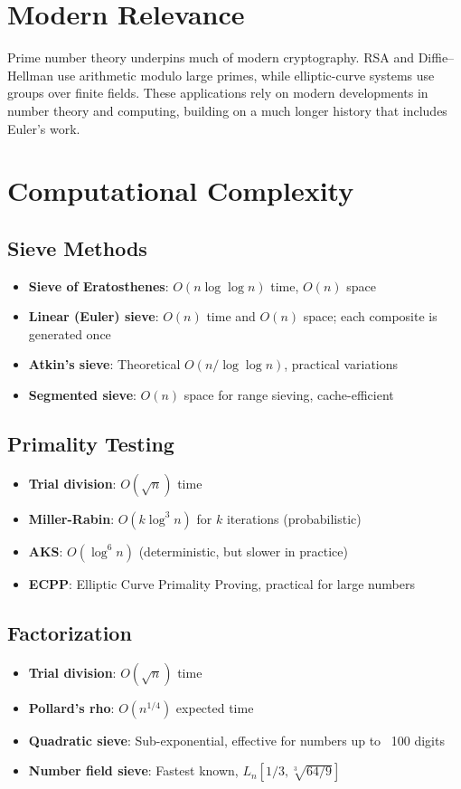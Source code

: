 \section{Modern Relevance}

Prime number theory underpins much of modern cryptography. RSA and Diffie--Hellman use arithmetic modulo large primes, while elliptic-curve systems use groups over finite fields. These applications rely on modern developments in number theory and computing, building on a much longer history that includes Euler's work.

\section{Computational Complexity}

\subsection{Sieve Methods}
\begin{itemize}
\item \textbf{Sieve of Eratosthenes}: $O(n \log \log n)$ time, $O(n)$ space
\item \textbf{Linear (Euler) sieve}: $O(n)$ time and $O(n)$ space; each composite is generated once
\item \textbf{Atkin's sieve}: Theoretical $O(n / \log \log n)$, practical variations
\item \textbf{Segmented sieve}: $O(n)$ space for range sieving, cache-efficient
\end{itemize}

\subsection{Primality Testing}
\begin{itemize}
\item \textbf{Trial division}: $O(\sqrt{n})$ time
\item \textbf{Miller-Rabin}: $O(k \log^3 n)$ for $k$ iterations (probabilistic)
\item \textbf{AKS}: $O(\log^{6} n)$ (deterministic, but slower in practice)
\item \textbf{ECPP}: Elliptic Curve Primality Proving, practical for large numbers
\end{itemize}

\subsection{Factorization}
\begin{itemize}
\item \textbf{Trial division}: $O(\sqrt{n})$ time
\item \textbf{Pollard's rho}: $O(n^{1/4})$ expected time
\item \textbf{Quadratic sieve}: Sub-exponential, effective for numbers up to ~100 digits
\item \textbf{Number field sieve}: Fastest known, $L_n[1/3, \sqrt[3]{64/9}]$
\end{itemize}

